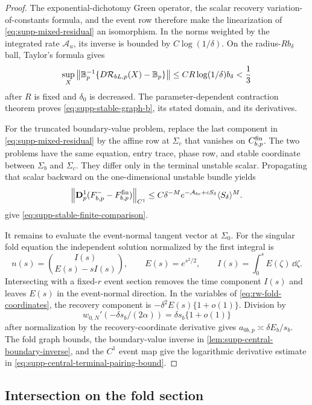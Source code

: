 \begin{proof}
The exponential-dichotomy Green operator, the scalar recovery
variation-of-constants formula, and the event row therefore make the
linearization of \cref{eq:supp-mixed-residual} an isomorphism.  In the
norms weighted by the integrated rate \(\mathcal A_u\), its inverse is bounded by
\(C\log(1/\delta)\).  On the radius-\(Rb_\delta\) ball, Taylor's formula
gives
\[
 \sup_X\left\lVert\mathbb B_p^{-1}
       \{D\mathcal R_{bL,p}(X)-\mathbb B_p\}\right\rVert
 \le CR\log(1/\delta)b_\delta<\frac13
\]
after \(R\) is fixed and \(\delta_0\) is decreased.  The
parameter-dependent contraction theorem proves
\cref{eq:supp-stable-graph-b}, its stated domain, and its derivatives.

For the truncated boundary-value problem, replace the last component in
\cref{eq:supp-mixed-residual} by the affine row at \(\Sigma_c\) that
vanishes on \(C_{b,p}^{\rm fin}\).  The two problems have the same
equation, entry trace, phase row, and stable coordinate between
\(\Sigma_b\) and \(\Sigma_c\).  They differ only in the terminal unstable
scalar.  Propagating that scalar backward on the one-dimensional unstable
bundle yields
\[
 \left\lVert\mathbf D_p^1(F_{b,p}^--F_{b,p}^{\rm fin})\right\rVert_{C^1}
 \le C\delta^{-M}e^{-\mathcal A_{bc}+cS_\delta}
       \langle S_\delta\rangle^M.
\]
give \cref{eq:supp-stable-finite-comparison}.

It remains to evaluate the event-normal tangent vector at \(\Sigma_0\).  For
the singular fold equation
the independent solution normalized by the first integral is
\[
 n(s)=\binom{I(s)}{E(s)-sI(s)},\qquad
 E(s)=e^{s^2/2},\qquad I(s)=\int_0^sE(\zeta)\,\dd\zeta.
\]
Intersecting with a fixed-\(r\) event section removes the time component
\(I(s)\) and leaves
\(E(s)\) in the event-normal direction.  In the variables of
\cref{eq:rw-fold-coordinates}, the recovery component is
\(-\delta^2E(s)\{1+o(1)\}\).  Division by
\[
 w_{0,N}'(-\delta s_b/(2\alpha))
 =\delta s_b\{1+o(1)\}
\]
after normalization by the recovery-coordinate derivative gives
\(a_{0b,p}\asymp\delta E_b/s_b\).  The fold graph bounds, the
boundary-value inverse in \cref{lem:supp-central-boundary-inverse}, and the
\(C^1\) event map give the logarithmic derivative estimate in
\cref{eq:supp-central-terminal-pairing-bound}.
\end{proof}

\subsection{Intersection on the fold section}

